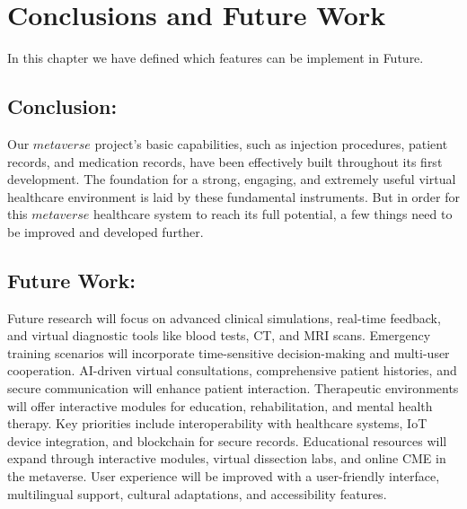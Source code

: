 \chapter{Conclusions and Future Work}
In this chapter we have defined which features can be implement in Future.
\section{Conclusion:}
Our $metaverse$ project's basic capabilities, such as injection procedures, patient records, and medication records, have been effectively built throughout its first development. The foundation for a strong, engaging, and extremely useful virtual healthcare environment is laid by these fundamental instruments. But in order for this $metaverse$ healthcare system to reach its full potential, a few things need to be improved and developed further.
\section{Future Work:}
Future research will focus on advanced clinical simulations, real-time feedback, and virtual diagnostic tools like blood tests, CT, and MRI scans. Emergency training scenarios will incorporate time-sensitive decision-making and multi-user cooperation. AI-driven virtual consultations, comprehensive patient histories, and secure communication will enhance patient interaction. Therapeutic environments will offer interactive modules for education, rehabilitation, and mental health therapy. Key priorities include interoperability with healthcare systems, IoT device integration, and blockchain for secure records. Educational resources will expand through interactive modules, virtual dissection labs, and online CME in the metaverse. User experience will be improved with a user-friendly interface, multilingual support, cultural adaptations, and accessibility features.
